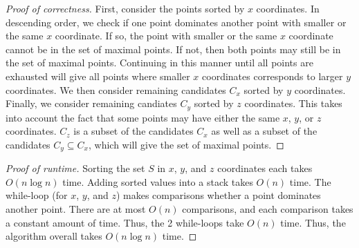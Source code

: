 \documentclass{article}
\begin{document}
\begin{proof}[Proof of correctness]
First, consider the points sorted by $x$ coordinates. In descending order, we check if one point dominates another point with smaller or the same $x$ coordinate. If so, the point with smaller or the same $x$ coordinate cannot be in the set of maximal points. If not, then both points may still be in the set of maximal points. Continuing in this manner until all points are exhausted will give all points where smaller $x$ coordinates corresponds to larger $y$ coordinates. We then consider remaining candidates $C_x$ sorted by $y$ coordinates. Finally, we consider remaining candiates $C_y$ sorted by $z$ coordinates. This takes into account the fact that some points may have either the same $x$, $y$, or $z$ coordinates. $C_z$ is a subset of the candidates $C_x$ as well as a subset of the candidates $C_y \subseteq C_x$, which will give the set of maximal points.
\end{proof}

\begin{proof}[Proof of runtime]
Sorting the set $S$ in $x$, $y$, and $z$ coordinates each takes $O(n \log n)$ time. Adding sorted values into a stack takes $O(n)$ time. The while-loop (for $x$, $y$, and $z$) makes comparisons whether a point dominates another point. There are at most $O(n)$ comparisons, and each comparison takes a constant amount of time. Thus, the 2 while-loops take $O(n)$ time. Thus, the algorithm overall takes $O(n \log n)$ time.
\end{proof}
\end{document}

